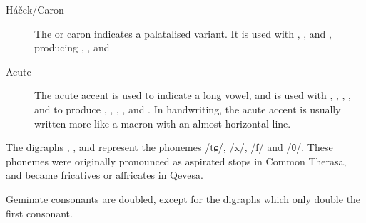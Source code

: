 \documentclass[grammar]{subfiles}
\begin{document}
\begin{description}
  \item[Háček/Caron] The  or caron indicates a palatalised
    variant.  It is used with , ,  and , producing ,
    ,  and   
  \item[Acute] The acute accent is used to indicate a long vowel, and is used
    with , , , ,  and  to produce , , ,
    ,  and .  In handwriting, the acute accent is usually written more
    like a macron with an almost horizontal line. 
\end{description}

The digraphs , ,  and  represent the phonemes /tɕ/,
/x/, /f/ and /θ/.  These phonemes were originally pronounced as aspirated stops
in Common Therasa, and became fricatives or affricates in Qevesa.

Geminate consonants are doubled, except for the digraphs which only double the
first consonant.  


\end{document}
